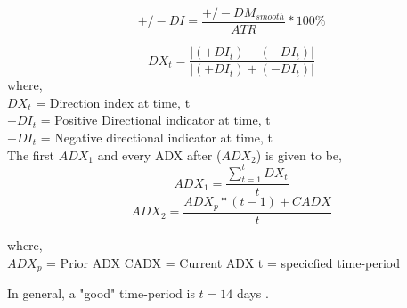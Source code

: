 \begin{equation}
    +/-DI = \frac{+/-DM_{smooth}}{ATR}* 100\%
\end{equation}

\begin{equation}
    DX_t = \frac{|(+DI_t)-(-DI_t)|}{|(+DI_t)+(-DI_t)|}
\end{equation}
where, \\
$DX_t$ = Direction index at time, t \\
$+DI_t$ = Positive Directional indicator at time, t \\
$-DI_t$ = Negative directional indicator at time, t \\

The first $ADX_1$ and every ADX after ($ADX_2$) is given to be,
\begin{equation}
    ADX_1 = \frac{\sum^{t}_{t=1}DX_t}{t}
\end{equation}
\begin{equation}
    ADX_2 = \frac{ADX_p * (t-1) + CADX}{t}
\end{equation}

\noindent where, \\
$ADX_p$ = Prior ADX
CADX = Current ADX
t = specicfied time-period

\noindent In general, a "good" time-period is $t=14$ days \cite{??}.
